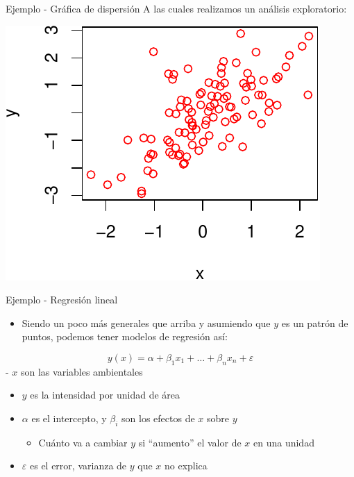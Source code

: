 \documentclass[
  11pt,
  ignorenonframetext,
]{beamer}
\providecommand{\tightlist}{%
  \setlength{\itemsep}{0pt}\setlength{\parskip}{0pt}}
\begin{document}
\begin{frame}{Ejemplo - Gráfica de dispersión}
\protect\hypertarget{ejemplo---gruxe1fica-de-dispersiuxf3n}{}
A las cuales realizamos un análisis exploratorio:

\includegraphics{Generalidades_files/figure-beamer/unnamed-chunk-3-1.pdf}
\end{frame}

\begin{frame}{Ejemplo - Regresión lineal}
\protect\hypertarget{ejemplo---regresiuxf3n-lineal}{}
\begin{itemize}
\tightlist
\item
  Siendo un poco más generales que arriba y asumiendo que \(y\) es un
  patrón de puntos, podemos tener modelos de regresión así:
\end{itemize}

\[ y(x) = \alpha + \beta_1 x_1 + \dots + \beta_n x_n + \varepsilon\] -
\(x\) son las variables ambientales

\begin{itemize}
\item
  \(y\) es la intensidad por unidad de área
\item
  \(\alpha\) es el intercepto, y \(\beta_i\) son los efectos de \(x\)
  sobre \(y\)

  \begin{itemize}
  \tightlist
  \item
    Cuánto va a cambiar \(y\) si ``aumento'' el valor de \(x\) en una
    unidad
  \end{itemize}
\item
  \(\varepsilon\) es el error, varianza de \(y\) que \(x\) no explica
\end{itemize}
\end{frame}
\end{document}
